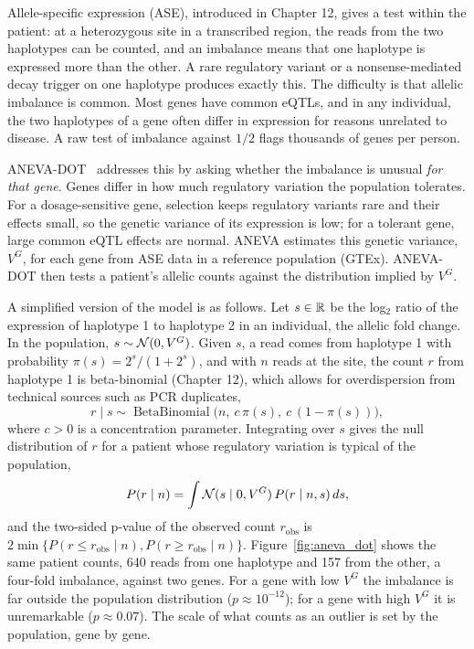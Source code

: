 Allele-specific expression (ASE), introduced in Chapter 12, gives a test within the patient: at a heterozygous site in a transcribed region, the reads from the two haplotypes can be counted, and an imbalance means that one haplotype is expressed more than the other. A rare regulatory variant or a nonsense-mediated decay trigger on one haplotype produces exactly this. The difficulty is that allelic imbalance is common. Most genes have common eQTLs, and in any individual, the two haplotypes of a gene often differ in expression for reasons unrelated to disease. A raw test of imbalance against $1/2$ flags thousands of genes per person.

ANEVA-DOT~\citep{mohammadi2019} addresses this by asking whether the imbalance is unusual \emph{for that gene}. Genes differ in how much regulatory variation the population tolerates. For a dosage-sensitive gene, selection keeps regulatory variants rare and their effects small, so the genetic variance of its expression is low; for a tolerant gene, large common eQTL effects are normal. ANEVA estimates this genetic variance, $V^G$, for each gene from ASE data in a reference population (GTEx). ANEVA-DOT then tests a patient's allelic counts against the distribution implied by $V^G$.

A simplified version of the model is as follows. Let $s\in\mathbb{R}$ be the log$_2$ ratio of the expression of haplotype 1 to haplotype 2 in an individual, the allelic fold change. In the population, $s\sim\mathcal{N}(0,V^G)$. Given $s$, a read comes from haplotype 1 with probability $\pi(s)=2^s/(1+2^s)$, and with $n$ reads at the site, the count $r$ from haplotype 1 is beta-binomial (Chapter 12), which allows for overdispersion from technical sources such as PCR duplicates,
\begin{equation}
  r\mid s \sim \operatorname{BetaBinomial}\big(n,\ c\,\pi(s),\ c\,(1-\pi(s))\big),
\end{equation}
where $c>0$ is a concentration parameter. Integrating over $s$ gives the null distribution of $r$ for a patient whose regulatory variation is typical of the population,
\begin{equation}
  P(r\mid n) = \int \mathcal{N}(s\mid 0, V^G)\,P(r\mid n,s)\,ds ,
\end{equation}
and the two-sided p-value of the observed count $r_{\text{obs}}$ is $2\min\{P(r\leq r_{\text{obs}}\mid n),P(r\geq r_{\text{obs}}\mid n)\}$. Figure~\ref{fig:aneva_dot} shows the same patient counts, 640 reads from one haplotype and 157 from the other, a four-fold imbalance, against two genes. For a gene with low $V^G$ the imbalance is far outside the population distribution ($p\approx 10^{-12}$); for a gene with high $V^G$ it is unremarkable ($p\approx 0.07$). The scale of what counts as an outlier is set by the population, gene by gene.


